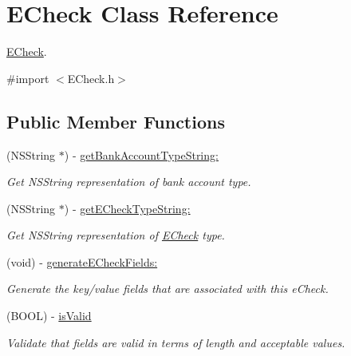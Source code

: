 \hypertarget{interface_e_check}{
\section{ECheck Class Reference}
\label{interface_e_check}
}


\hyperlink{interface_e_check}{ECheck}.  




{\ttfamily \#import $<$ECheck.h$>$}

\subsection*{Public Member Functions}
\begin{DoxyCompactItemize}
\item 
(NSString $\ast$) -\/ \hyperlink{interface_e_check_a1e9c099c57eda74f9ca3b61fddb55bf0}{getBankAccountTypeString:}
\begin{DoxyCompactList}\small\item\em Get NSString representation of bank account type. \item\end{DoxyCompactList}\item 
(NSString $\ast$) -\/ \hyperlink{interface_e_check_a236d483c58c4b529055a34b3819c8e68}{getECheckTypeString:}
\begin{DoxyCompactList}\small\item\em Get NSString representation of \hyperlink{interface_e_check}{ECheck} type. \item\end{DoxyCompactList}\item 
(void) -\/ \hyperlink{interface_e_check_ae10e1bf62891812f48124d0e7274c492}{generateECheckFields:}
\begin{DoxyCompactList}\small\item\em Generate the key/value fields that are associated with this eCheck. \item\end{DoxyCompactList}\item 
(BOOL) -\/ \hyperlink{interface_e_check_a07435fa1584ced8083778daccfa45132}{isValid}
\begin{DoxyCompactList}\small\item\em Validate that fields are valid in terms of length and acceptable values. \item\end{DoxyCompactList}\end{DoxyCompactItemize}
